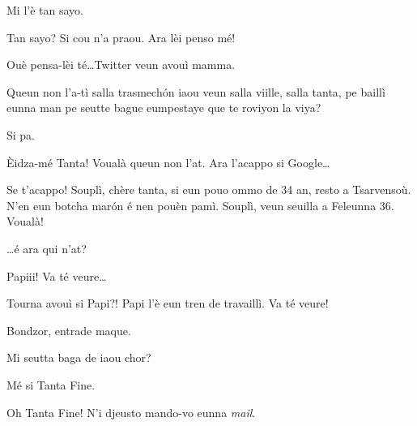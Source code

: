 \begin{drama}
\Alicespeaks Mi l'è tan sayo.

\Tanteunspeaks Tan sayo? Si cou n'a praou. Ara lèi penso mé!


\Alicespeaks Ouè pensa-lèi té\ldots Twitter veun avouì mamma.

\Tanteunspeaks Queun non l'a-tì salla trasmech\'on iaou veun salla viille, salla tanta, pe baillì eunna man pe seutte  bague eumpestaye que te roviyon la viya?

\Alicespeaks Si pa.

\Tanteunspeaks \og \`Eidza-mé Tanta\fg! Voualà queun non l'at. Ara l'acappo si Google\ldots


\Tanteunspeaks{} Se t'acappo!  \og Souplì, chère tanta, si eun pouo ommo de 34 an, resto a Tsarvensoù. N'en eun botcha mar\'on é nen pouèn pamì. Souplì, veun seuilla a Feleunna 36\fg. Voualà! 



\Tanteunspeaks \ldots é ara qui n'at?

\Alicespeaks Papiii! Va té veure\ldots

\Tanteunspeaks Tourna avouì si Papi?! Papi l'è eun tren de travaillì. Va té veure!


\Alicespeaks{} Bondzor, entrade maque.

\label{tata}


\Tanteunspeaks{} Mi seutta baga de iaou chor?

\Tantaspeaks{} Mé si Tanta Fine.

\Tanteunspeaks{} Oh Tanta Fine! N'i djeusto mando-vo eunna \textit{mail}.


\end{drama}
